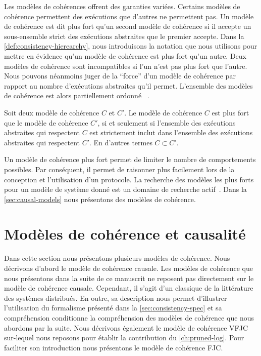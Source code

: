 Les modèles de cohérences offrent des garanties variées.
Certains modèles de cohérence permettent des exécutions que d'autres ne permettent pas.
Un modèle de cohérence est dit plus fort qu'un second modèle de cohérence si il accepte un sous-ensemble strict des exécutions abstraites que le premier accepte.
Dans la \autoref{def:consistency-hierearchy}, nous introduisons la notation que nous utilisons pour mettre en évidence qu'un modèle de cohérence est plus fort qu'un autre.
Deux modèles de cohérence sont incompatibles si l'un n'est pas plus fort que l'autre.
Nous pouvons néanmoins juger de la \enquote{force} d'un modèle de cohérence par rapport au nombre d'exécutions abstraites qu'il permet.
L'ensemble des modèles de cohérence est alors partiellement ordonné
~\autocite{viotti_consistency_2016}.

\begin{definition}\label{def:consistency-hierearchy}
Soit deux modèle de cohérence $C$ et $C'$.
Le modèle de cohérence $C$ est plus fort que le modèle de cohérence $C'$, si et seulement si l'ensemble des exécutions abstraites qui respectent $C$ est strictement inclut dans l'ensemble des exécutions abstraites qui respectent $C'$.
En d'autres termes $C \subset C'$.
\end{definition}

Un modèle de cohérence plus fort permet de limiter le nombre de comportements possibles.
Par conséquent, il permet de raisonner plus facilement lors de la conception et l'utilisation d'un protocole.
La recherche des modèles les plus forts pour un modèle de système donné est un domaine de recherche actif~\cite{mahajan_2011_cac,guerraoui_2016_tradeoffs-replication,viotti_consistency_2016}.
Dans la \autoref{sec:causal-models} nous présentons des modèles de cohérence.


\section{Modèles de cohérence et causalité}\label{sec:causal-models}

Dans cette section nous présentons plusieurs modèles de cohérence.
Nous décrivons d'abord le modèle de cohérence causale.
Les modèles de cohérence que nous présentons dans la suite de ce manuscrit ne reposent pas directement sur le modèle de cohérence causale.
Cependant, il s'agit d'un classique de la littérature des systèmes distribués.
En outre, sa description nous permet d'illustrer l'utilisation du formalisme présenté dans la \autoref{sec:consistency-spec} et sa compréhension conditionne la compréhension des modèles de cohérence que nous abordons par la suite.
Nous décrivons également le modèle de cohérence \acf{VFJC} sur-lequel nous reposons pour établir la contribution du \autoref{ch:pruned-log}.
Pour faciliter son introduction nous présentons le modèle de cohérence \acf{FJC}.


